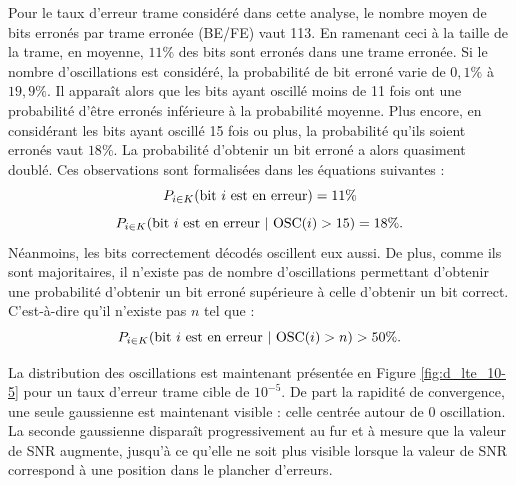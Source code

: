 Pour le taux d'erreur trame considéré dans cette analyse, le nombre moyen de bits erronés par trame erronée (BE/FE) vaut 
113. En ramenant ceci à la taille de la trame, en moyenne, $11\%$ des bits sont erronés dans une trame erronée. 
Si le nombre d'oscillations est considéré, la probabilité de bit erroné varie de $0,1\%$ à $19,9\%$. Il apparaît alors 
que les bits ayant oscillé moins de 11 fois ont une probabilité d'être erronés inférieure à la probabilité moyenne. Plus encore, 
en considérant les bits ayant oscillé 15 fois ou plus, la probabilité qu'ils soient erronés vaut $18\%$. La probabilité 
d'obtenir un bit erroné a alors quasiment doublé. 
Ces observations sont formalisées dans les équations suivantes :
\[P_{i \in K} (\textnormal{bit } i \textnormal{ est en erreur}) = 11 \%\]
\[P_{i \in K} (\textnormal{bit } i \textnormal{ est en erreur}\ |\ \textnormal{OSC}(i) > 15 ) = 18 \%.\]
Néanmoins, les bits correctement décodés oscillent eux aussi. De plus, comme ils sont majoritaires, il n'existe pas de 
nombre d'oscillations permettant d'obtenir une probabilité d'obtenir un bit erroné supérieure à celle d'obtenir un bit
correct. C'est-à-dire qu'il n'existe pas $n$ tel que : 
\[P_{i \in K} (\textnormal{bit } i \textnormal{ est en erreur}\ |\ \textnormal{OSC}(i) > n ) > 50 \%.\]

La distribution des oscillations est maintenant présentée en Figure \ref{fig:d_lte_10-5} pour un  taux d'erreur trame 
cible de $10^{-5}$. De part la rapidité de convergence, une seule gaussienne est maintenant visible : celle centrée autour 
de $0$ oscillation. 
La seconde gaussienne disparaît progressivement au fur et à mesure que la valeur de SNR augmente, jusqu'à ce qu'elle ne 
soit plus visible lorsque la valeur de SNR correspond à une position dans le plancher d'erreurs.

